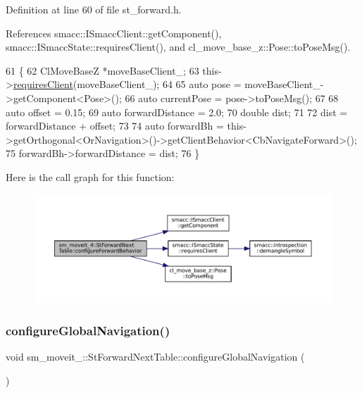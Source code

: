Definition at line 60 of file st\+\_\+forward.\+h.



References smacc\+::\+I\+Smacc\+Client\+::get\+Component(), smacc\+::\+I\+Smacc\+State\+::requires\+Client(), and cl\+\_\+move\+\_\+base\+\_\+z\+::\+Pose\+::to\+Pose\+Msg().


\begin{DoxyCode}
61   \{
62     ClMoveBaseZ *moveBaseClient\_;
63     this->\hyperlink{classsmacc_1_1ISmaccState_a7f95c9f0a6ea2d6f18d1aec0519de4ac}{requiresClient}(moveBaseClient\_);
64 
65     \textcolor{keyword}{auto} pose = moveBaseClient\_->getComponent<Pose>();
66     \textcolor{keyword}{auto} currentPose = pose->toPoseMsg();
67 
68     \textcolor{keyword}{auto} offset = 0.15;
69     \textcolor{keyword}{auto} forwardDistance = 2.0;
70     \textcolor{keywordtype}{double} dist;
71     
72     dist = forwardDistance + offset;
73 
74     \textcolor{keyword}{auto} forwardBh = this->getOrthogonal<OrNavigation>()->getClientBehavior<CbNavigateForward>();
75     forwardBh->forwardDistance = dist;
76   \}
\end{DoxyCode}
Here is the call graph for this function\+:
\nopagebreak
\begin{figure}[H]
\begin{center}
\leavevmode
\includegraphics[width=350pt]{structsm__moveit__4_1_1StForwardNextTable_a2b013c93591dfcd1babadf6cb6983667_cgraph}
\end{center}
\end{figure}
\mbox{\label{structsm__moveit__4_1_1StForwardNextTable_abda625487098c60f3d0507092aba19ce}} 
\subsubsection{\texorpdfstring{configure\+Global\+Navigation()}{configureGlobalNavigation()}}
{\footnotesize\ttfamily void sm\+\_\+moveit\+\_\+::\+St\+Forward\+Next\+Table\+::configure\+Global\+Navigation (\begin{DoxyParamCaption}{ }\end{DoxyParamCaption})\hspace{0.3cm}{\ttfamily [inline]}}



